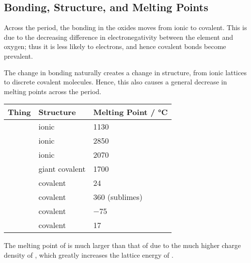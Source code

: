 		\subsection{Bonding, Structure, and Melting Points}

			Across the period, the bonding in the oxides moves from ionic to covalent. This is due to the decreasing difference
			in electronegativity between the element and oxygen; thus it is less likely to  electrons, and hence
			covalent bonds become prevalent.

			The change in bonding naturally creates a change in structure, from ionic lattices to discrete covalent molecules. Hence, this
			also causes a general decrease in melting points across the period.

			\begin{table}[htb]\renewcommand{\arraystretch}{1.5}\begin{center}
			\begin{tabu} to 0.7\textwidth { X[c,m] | X[c,m] | X[c,m] }

				Thing       &   Structure       &   Melting Point / \si{\celsius}   \\ \hline
				   &   ionic           &   \num{1130}                      \\
				    &   ionic           &   \num{2850}                      \\
				 &   ionic           &   \num{2070}                      \\
				   &   giant covalent  &   \num{1700}                      \\
				   &   covalent        &   \num{24}                        \\
				  &   covalent        &   \num{360} (sublimes)            \\
				    &   covalent        &   \num{-75}                       \\
				    &   covalent        &   \num{17}                        \\

			\end{tabu}\end{center}
			\end{table}\vspace{-1em}

			The melting point of  is much larger than that of  due to the much higher charge density of , which
			greatly increases the lattice energy of .

